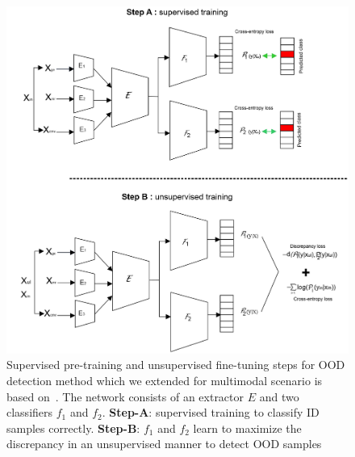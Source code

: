 \begin{figure}
    \centering
    \includegraphics[scale=0.9]{images/OOD_1.png}
    \caption[Supervised pre-training and unsupervised fine-tuning steps for OOD detection]{Supervised pre-training and unsupervised fine-tuning steps for OOD detection method which we extended for multimodal scenario is based on~\cite{yu2019unsupervised}. The network consists of an extractor $E$ and two classifiers $f_{1}$ and $f_{2}$. \textbf{Step-A}: supervised training to classify ID samples correctly. \textbf{Step-B}: $f_{1}$ and $f_{2}$ learn to maximize the discrepancy in an unsupervised manner to detect OOD samples}
    \label{fig:ood_network}
    \vspace{-2mm}
\end{figure}

